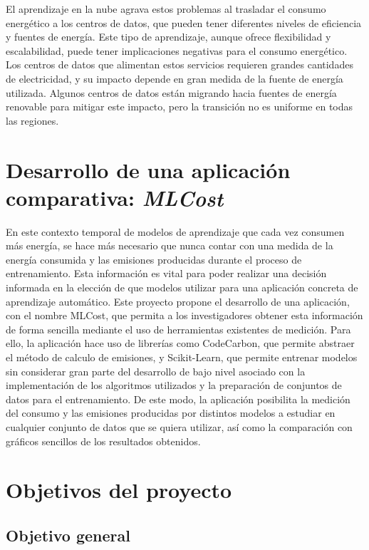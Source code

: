 El aprendizaje en la nube agrava estos problemas al trasladar el consumo energético a los centros de datos, que pueden tener diferentes niveles de eficiencia y fuentes de energía. Este tipo de aprendizaje, aunque ofrece flexibilidad y escalabilidad, puede tener implicaciones negativas para el consumo energético. Los centros de datos que alimentan estos servicios requieren grandes cantidades de electricidad, y su impacto depende en gran medida de la fuente de energía utilizada. Algunos centros de datos están migrando hacia fuentes de energía renovable para mitigar este impacto, pero la transición no es uniforme en todas las regiones.


\section{Desarrollo de una aplicación comparativa: \emph{MLCost}}

En este contexto temporal de modelos de aprendizaje que cada vez consumen más energía, se hace más necesario que nunca contar con una medida de la energía consumida y las emisiones producidas durante el proceso de entrenamiento. Esta información es vital para poder realizar una decisión informada en la elección de que modelos utilizar para una aplicación concreta de aprendizaje automático. Este proyecto propone el desarrollo de una aplicación, con el nombre MLCost, que permita a los investigadores obtener esta información de forma sencilla mediante el uso de herramientas existentes de medición. Para ello, la aplicación hace uso de librerías como CodeCarbon, que permite abstraer el método de calculo de emisiones, y Scikit-Learn, que permite entrenar modelos sin considerar gran parte del desarrollo de bajo nivel asociado con la implementación de los algoritmos utilizados y la preparación de conjuntos de datos para el entrenamiento. De este modo, la aplicación posibilita la medición del consumo y las emisiones producidas por distintos modelos a estudiar en cualquier conjunto de datos que se quiera utilizar, así como la comparación con gráficos sencillos de los resultados obtenidos.


\section{Objetivos del proyecto}
\label{sec:objetivos}

\subsection{Objetivo general}
\label{sec:objetivo-general}


